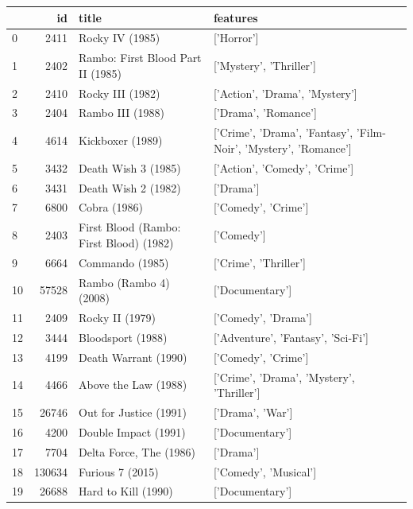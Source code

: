 
\begin{tabular}{lrll}
\toprule
 & id & title & features \\
\midrule
0 & 2411 & Rocky IV (1985) & ['Horror'] \\
1 & 2402 & Rambo: First Blood Part II (1985) & ['Mystery', 'Thriller'] \\
2 & 2410 & Rocky III (1982) & ['Action', 'Drama', 'Mystery'] \\
3 & 2404 & Rambo III (1988) & ['Drama', 'Romance'] \\
4 & 4614 & Kickboxer (1989) & ['Crime', 'Drama', 'Fantasy', 'Film-Noir', 'Mystery', 'Romance'] \\
5 & 3432 & Death Wish 3 (1985) & ['Action', 'Comedy', 'Crime'] \\
6 & 3431 & Death Wish 2 (1982) & ['Drama'] \\
7 & 6800 & Cobra (1986) & ['Comedy', 'Crime'] \\
8 & 2403 & First Blood (Rambo: First Blood) (1982) & ['Comedy'] \\
9 & 6664 & Commando (1985) & ['Crime', 'Thriller'] \\
10 & 57528 & Rambo (Rambo 4) (2008) & ['Documentary'] \\
11 & 2409 & Rocky II (1979) & ['Comedy', 'Drama'] \\
12 & 3444 & Bloodsport (1988) & ['Adventure', 'Fantasy', 'Sci-Fi'] \\
13 & 4199 & Death Warrant (1990) & ['Comedy', 'Crime'] \\
14 & 4466 & Above the Law (1988) & ['Crime', 'Drama', 'Mystery', 'Thriller'] \\
15 & 26746 & Out for Justice (1991) & ['Drama', 'War'] \\
16 & 4200 & Double Impact (1991) & ['Documentary'] \\
17 & 7704 & Delta Force, The (1986) & ['Drama'] \\
18 & 130634 & Furious 7 (2015) & ['Comedy', 'Musical'] \\
19 & 26688 & Hard to Kill (1990) & ['Documentary'] \\
\bottomrule
\end{tabular}
